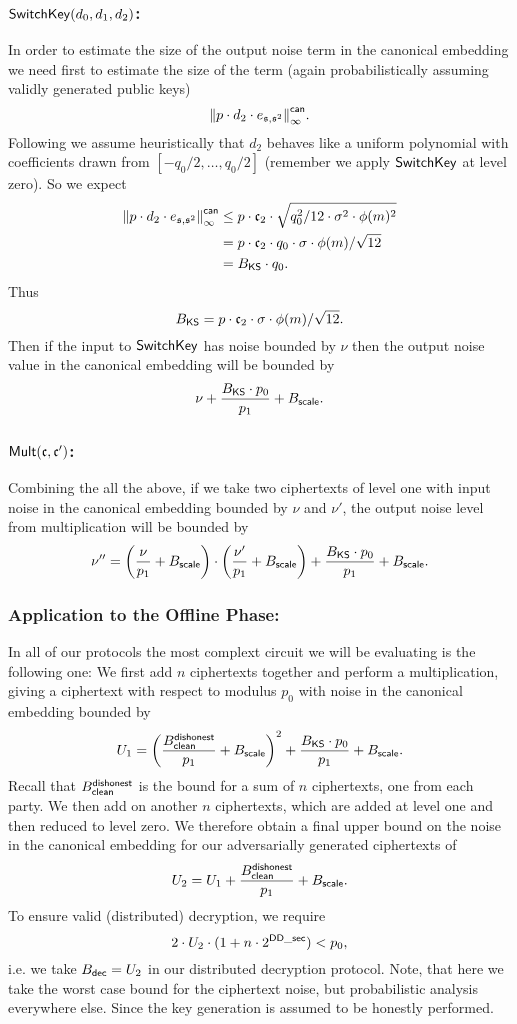 \subsubsection{$\mathsf{SwitchKey}(d_0,d_1,d_2)$:}
In order to estimate the size of the output noise term 
in the canonical embedding we need first to estimate the size of the term
(again probabilistically assuming validly generated public
keys)
\[ {\Vert p \cdot d_2 \cdot e_{\mathfrak{s},\mathfrak{s}^2} \Vert}_\infty^{\mathsf{can}}. \]
Following \cite{GHS12c} we assume heuristically that $d_2$
behaves like a uniform polynomial with coefficients drawn from
$[-q_0/2,\ldots,q_0/2]$ (remember we apply $\mathsf{SwitchKey}$ at level
zero).
So we expect
\begin{align*}
 {\Vert  p \cdot d_2 \cdot e_{\mathfrak{s},\mathfrak{s}^2} \Vert}_\infty^{\mathsf{can}} 
     &\le p \cdot \mathfrak{c}_2 \cdot \sqrt{q_0^2/12 \cdot \sigma^2 \cdot \phi(m)^2} \\
     & = p \cdot \mathfrak{c}_2 \cdot q_0 \cdot \sigma \cdot \phi(m)/\sqrt{12} \\
     & = B_{\mathsf{KS}} \cdot q_0.
\end{align*}
Thus
\[ B_{\mathsf{KS}} = p \cdot \mathfrak{c}_2 \cdot \sigma \cdot \phi(m)/\sqrt{12}. \]
Then if the input to $\mathsf{SwitchKey}$ has noise bounded by $\nu$ then the output 
noise value in the canonical embedding will be bounded by
\[ \nu+\frac{B_{\mathsf{KS}} \cdot p_0}{p_1} + B_{\mathsf{scale}}. \]


\subsubsection{$\mathsf{Mult}(\mathfrak{c},\mathfrak{c}')$:}
Combining the all the above, if we take two ciphertexts of level one
with input noise in the canonical embedding bounded by $\nu$ and $\nu'$, the output noise level 
from multiplication will be bounded by
\[ \nu'' =      \left( \frac{\nu}{p_1} + B_{\mathsf{scale}} \right)
	  \cdot 
                \left( \frac{\nu'}{p_1} + B_{\mathsf{scale}} \right)
		+ \frac{B_{\mathsf{KS}} \cdot p_0}{p_1}+B_{\mathsf{scale}}.
\]

\subsubsection{Application to the Offline Phase:}
In all of our protocols the most complext circuit we will be evaluating 
is the following one: 
We first add $n$ ciphertexts together and perform a multiplication, giving a 
ciphertext with respect to modulus $p_0$ with noise in the canonical
embedding bounded by
\[
  U_1 = \left( \frac{B_{\mathsf{clean}}^{\mathsf{dishonest}}}{p_1}+B_{\mathsf{scale}} \right)^2
		+ \frac{B_{\mathsf{KS}} \cdot p_0}{p_1} + B_{\mathsf{scale}}.
\]
Recall that $B_{\mathsf{clean}}^{\mathsf{dishonest}}$ is the bound for a sum of 
$n$ ciphertexts, one from each party.
We then add on another $n$ ciphertexts, which are added at 
level one and then reduced to level zero.
We therefore obtain a final upper bound on the noise 
in the canonical embedding for our adversarially generated ciphertexts of
\[ U_2 = U_1 +  \frac{B_{\mathsf{clean}}^{\mathsf{dishonest}}}{p_1} + B_{\mathsf{scale}}. \]
To ensure valid (distributed) decryption, we require
\[ 2 \cdot U_2 \cdot (1+n \cdot 2^{\mathsf{DD\_sec}}) < p_0, \]
i.e. we take $B_{\mathsf{dec}}=U_2$ in our distributed decryption protocol.
Note, that here we take the worst case bound for the ciphertext
noise, but probabilistic analysis everywhere else. Since 
the key generation is assumed to be honestly performed.


